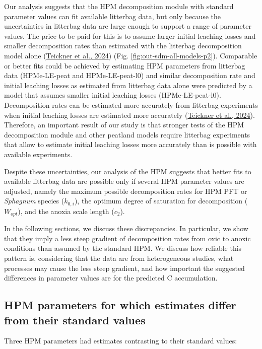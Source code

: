 \documentclass[
  12pt,
]{article}
\begin{document}
Our analysis suggests that the HPM decomposition module with standard parameter values can fit available litterbag data, but only because the uncertainties in litterbag data are large enough to support a range of parameter values. The price to be paid for this is to assume larger initial leaching losses and smaller decomposition rates than estimated with the litterbag decomposition model alone (\protect\hyperlink{ref-Teickner.2024}{Teickner et al., 2024}) (Fig. \ref{fig:out-sdm-all-models-p2}). Comparable or better fits could be achieved by estimating HPM parameters from litterbag data (HPMe-LE-peat and HPMe-LE-peat-l0) and similar decomposition rate and initial leaching losses as estimated from litterbag data alone were predicted by a model that assumes smaller initial leaching losses (HPMe-LE-peat-l0). Decomposition rates can be estimated more accurately from litterbag experiments when initial leaching losses are estimated more accurately (\protect\hyperlink{ref-Teickner.2024}{Teickner et al., 2024}). Therefore, an important result of our study is that stronger tests of the HPM decomposition module and other peatland models require litterbag experiments that allow to estimate initial leaching losses more accurately than is possible with available experiments.

Despite these uncertainties, our analysis of the HPM suggests that better fits to available litterbag data are possible only if several HPM parameter values are adjusted, namely the maximum possible decomposition rates for HPM PFT or \emph{Sphagnum} species (\(k_{0,i}\)), the optimum degree of saturation for decomposition (\(W_{opt}\)), and the anoxia scale length (\(c_2\)).

In the following sections, we discuss these discrepancies. In particular, we show that they imply a less steep gradient of decomposition rates from oxic to anoxic conditions than assumed by the standard HPM. We discuss how reliable this pattern is, considering that the data are from heterogeneous studies, what processes may cause the less steep gradient, and how important the suggested differences in parameter values are for the predicted C accumulation.

\hypertarget{out-discussion-1}{%
\subsection{HPM parameters for which estimates differ from their standard values}\label{out-discussion-1}}

Three HPM parameters had estimates contrasting to their standard values:
\end{document}
